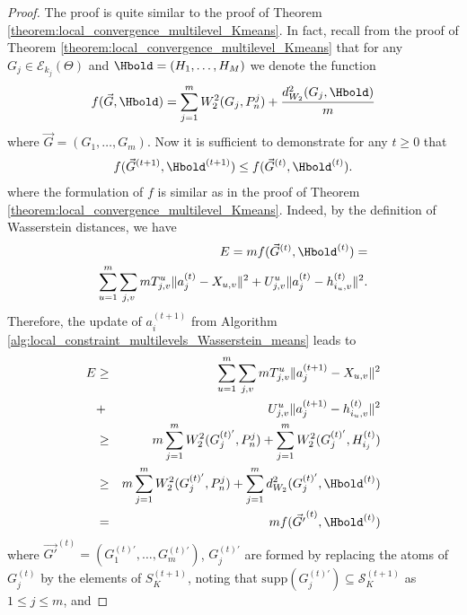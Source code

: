 \begin{proof}
The proof is quite similar to the proof of Theorem \ref{theorem:local_convergence_multilevel_Kmeans}. In fact, recall from the proof of Theorem \ref{theorem:local_convergence_multilevel_Kmeans} that for any $G_{j} \in \mathcal{E}_{k_{j}}(\Theta)$ and $\Hbold =(H_{1},\ldots,H_{M})$ we denote the function 
\begin{eqnarray}
f(\vec{G}, \Hbold)=\mathop {\sum }\limits_{j=1}^{m}{W_{2}^{2}(G_{j},P_{n}^{j})}+\dfrac{d_{W_{2}}^{2}(G_{j},\Hbold)}{m} \nonumber
\end{eqnarray}
where $\vec{G}=(G_{1},\ldots,G_{m})$. Now it is sufficient to demonstrate for any $t \geq 0$ that
\begin{eqnarray}
f(\vec{G}^{(t+1)},\Hbold^{(t+1)}) \leq f(\vec{G}^{(t)},\Hbold^{(t)}). \nonumber
\end{eqnarray}
where the formulation of $f$ is similar as in the proof of Theorem \ref{theorem:local_convergence_multilevel_Kmeans}. %
Indeed, by the definition of Wasserstein distances, we have
\begin{eqnarray}
E = m f(\vec{G}^{(t)},\Hbold^{(t)})  = \nonumber \\
 \sum \limits_{u=1}^{m}{\sum \limits_{j,v}{mT_{j,v}^{u}\|a_{j}^{(t)}-X_{u,v}\|^{2}} +  U_{j,v}^{u}\|a_{j}^{(t)}-h_{i_{u},v}^{(t)}\|^{2}}. \nonumber
\end{eqnarray}
Therefore, the update of $a_{i}^{(t+1)}$ from Algorithm \ref{alg:local_constraint_multilevels_Wasserstein_means} %
leads to
\begin{eqnarray}
E & \geq &  \sum \limits_{u=1}^{m}{\sum \limits_{j,v}{mT_{j,v}^{u}\|a_{j}^{(t+1)}-X_{u,v}\|^{2}}} \nonumber \\
& + & U_{j,v}^{u}\|a_{j}^{(t+1)}-h_{i_{u},v}^{(t)}\|^{2} \nonumber \\
& \geq & m \sum \limits_{j=1}^{m}{W_{2}^{2}(G_{j}^{(t)'},P_{n}^{j})}+\sum \limits_{j=1}^{m}{W_{2}^{2}(G_{j}^{(t)'},H_{i_{j}}^{(t)})} \nonumber \\
& \geq & m \sum \limits_{j=1}^{m}{W_{2}^{2}(G_{j}^{(t)'},P_{n}^{j})}+\sum \limits_{j=1}^{m}{d_{W_{2}}^{2}(G_{j}^{(t)'},\Hbold^{(t)})} \nonumber \\
& = & mf(\vec{G'}^{(t)},\Hbold^{(t)}) \nonumber
\end{eqnarray}
where $\vec{G'}^{(t)}=(G_{1}^{(t)'},\ldots,G_{m}^{(t)'})$, $G_{j}^{(t)'}$ are formed by replacing the atoms of $G_{j}^{(t)}$ by the 
elements of $S_{K}^{(t+1)}$, noting that $\text{supp}(G_{j}^{(t)'}) \subseteq  \mathcal{S}_{K}^{(t+1)}$ as $1 \leq j \leq m$, and 

\end{proof}
